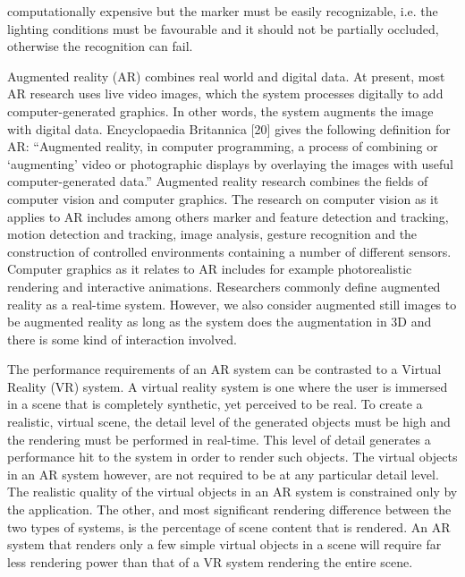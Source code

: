 computationally expensive but the marker must be easily recognizable, i.e. the lighting conditions must be favourable and it should not be partially occluded, otherwise the recognition can fail.



Augmented reality (AR) combines real world and digital data. At present, most AR research uses live video images, which the system processes digitally to add computer-generated graphics. In other words, the system augments the image with digital data. Encyclopaedia Britannica [20] gives the following definition for AR: “Augmented reality, in computer programming, a process of combining or ‘augmenting’ video or photographic displays by overlaying the images with useful computer-generated data.” Augmented reality research combines the fields of computer vision and computer graphics. The research on computer vision as it applies to AR includes among others marker and feature detection and tracking, motion detection and tracking, image analysis, gesture recognition and the construction of controlled environments containing a number of different sensors. Computer graphics as it relates to AR includes for example photorealistic rendering and interactive animations. Researchers commonly define augmented reality as a real-time system. However, we also consider augmented still images to be augmented reality as long as the system does the augmentation in 3D and there is some kind of interaction involved.

The performance requirements of an AR system can be contrasted to a Virtual Reality (VR) system. A virtual reality system is one where the user is immersed in a scene that is completely synthetic, yet perceived to be real. To create a realistic, virtual scene, the detail level of the generated objects must be high and the rendering must be performed in real-time. This level of detail generates a performance hit to the system in order to render such objects. The virtual objects in an AR system however, are not required to be at any particular detail level. The realistic quality of the virtual objects in an AR system is constrained only by the application. The other, and most significant rendering difference between the two types of systems, is the percentage of scene content that is rendered. An AR system that renders only a few simple virtual objects in a scene will require far less rendering power than that of a VR system rendering the entire scene.


